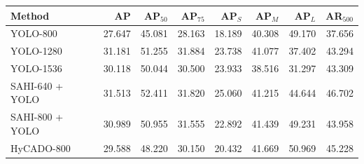 \begin{tabular}{lrrrrrrr}
\toprule
Method & AP & AP$_{50}$ & AP$_{75}$ & AP$_S$ & AP$_M$ & AP$_L$ & AR$_{500}$\\
\midrule
YOLO-800 & 27.647 & 45.081 & 28.163 & 18.189 & 40.308 & 49.170 & 37.656\\
YOLO-1280 & 31.181 & 51.255 & 31.884 & 23.738 & 41.077 & 37.402 & 43.294\\
YOLO-1536 & 30.118 & 50.044 & 30.500 & 23.933 & 38.516 & 31.297 & 43.309\\
SAHI-640 + YOLO & 31.513 & 52.411 & 31.820 & 25.060 & 41.215 & 44.644 & 46.702\\
SAHI-800 + YOLO & 30.989 & 50.955 & 31.555 & 22.892 & 41.439 & 49.231 & 43.958\\
HyCADO-800 & 29.588 & 48.220 & 30.150 & 20.432 & 41.669 & 50.969 & 45.228\\
\bottomrule
\end{tabular}
